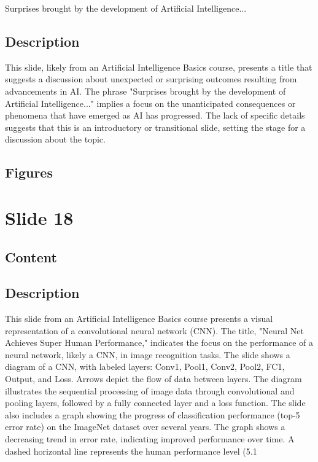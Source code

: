 \documentclass{article}%
\begin{document}
Surprises brought by the development of Artificial Intelligence...
%
\subsection{Description}%
This slide, likely from an Artificial Intelligence Basics course, presents a title that suggests a discussion about unexpected or surprising outcomes resulting from advancements in AI.  The phrase "Surprises brought by the development of Artificial Intelligence..." implies a focus on the unanticipated consequences or phenomena that have emerged as AI has progressed.  The lack of specific details suggests that this is an introductory or transitional slide, setting the stage for a discussion about the topic.%
\subsection{Figures}%
\begin{figure}[H]%
\centering%
\end{figure}

%
\newpage%
\section{Slide 18}%
\label{sec:Slide18}%
\subsection{Content}%
%
\subsection{Description}%
This slide from an Artificial Intelligence Basics course presents a visual representation of a convolutional neural network (CNN).  The title, "Neural Net Achieves Super Human Performance," indicates the focus on the performance of a neural network, likely a CNN, in image recognition tasks.  The slide shows a diagram of a CNN, with labeled layers: Conv1, Pool1, Conv2, Pool2, FC1, Output, and Loss.  Arrows depict the flow of data between layers.  The diagram illustrates the sequential processing of image data through convolutional and pooling layers, followed by a fully connected layer and a loss function.  The slide also includes a graph showing the progress of classification performance (top-5 error rate) on the ImageNet dataset over several years.  The graph shows a decreasing trend in error rate, indicating improved performance over time.  A dashed horizontal line represents the human performance level (5.1%
\end{document}
